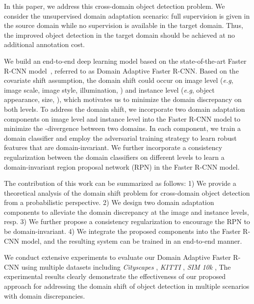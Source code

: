 \documentclass[10pt,twocolumn,letterpaper]{article}
\def\eg{\emph{e.g}}
\def\dim{\textit{SIM 10k} }
\def\cs{\textit{Cityscapes} }
\def\kitti{\textit{KITTI} }
\begin{document}
In this paper, we address this cross-domain object detection problem. We consider the unsupervised domain adaptation scenario: full supervision is given in the source domain while no supervision is available in the target domain. Thus, the improved object detection in the target domain should be achieved at no additional annotation cost. 

We build an end-to-end deep learning model based on the state-of-the-art Faster R-CNN model~\cite{ren2015faster}, referred to as Domain Adaptive Faster R-CNN. 
Based on the covariate shift assumption, the domain shift could occur on image level (\eg, image scale, image style, illumination, \etc) and instance level (\eg, object appearance, size, \etc), which motivates us to minimize the domain discrepancy on both levels. To address the domain shift, we incorporate two domain adaptation components on image level and instance level into the Faster R-CNN model to minimize the -divergence between two domains. In each component, we train a domain classifier and employ the adversarial training strategy to learn robust features that are domain-invariant. We further incorporate a consistency regularization between the domain classifiers on different levels to learn a domain-invariant region proposal network (RPN) in the Faster R-CNN model.

The contribution of this work can be summarized as follows: 1) We provide a theoretical analysis of the domain shift problem for cross-domain object detection from a probabilistic perspective. 2) We design two domain adaptation components to alleviate the domain discrepancy at the image and instance levels, resp. 3) We further propose a consistency regularization to encourage the RPN to be domain-invariant. 4) We integrate the proposed components into the Faster R-CNN model, and the resulting system can be trained in an end-to-end manner.

We conduct extensive experiments to evaluate our Domain Adaptive Faster R-CNN using multiple datasets including \cs\cite{cordts2016cityscapes}, \kitti\cite{geiger2013vision}, \dim\cite{johnson2017driving}, \etc The experimental results clearly demonstrate the effectiveness of our proposed approach for addressing the domain shift of object detection in multiple scenarios with domain discrepancies.
\end{document}
